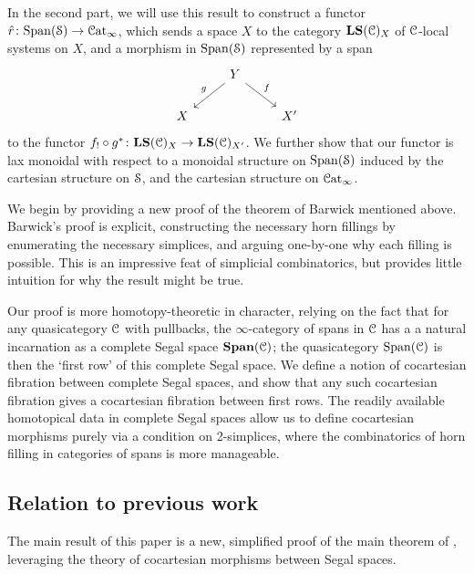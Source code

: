 \documentclass[main.tex]{subfiles}
\begin{document}
In the second part, we will use this result to construct a functor $\hat{r}\colon \Span(\category{S}) \to \ICat$, which sends a space $X$ to the category $\LS(\category{C})_{X}$ of $\category{C}$-local systems on $X$, and a morphism in $\Span(\S)$ represented by a span
\begin{equation*}
  \begin{tikzcd}
    & Y
    \arrow[dl, swap, "g"]
    \arrow[dr, "f"]
    \\
    X
    && X'
  \end{tikzcd}
\end{equation*}
to the functor $f_{!} \circ g^{*}\colon \LS(\category{C})_{X} \to \LS(\category{C})_{X'}$. We further show that our functor is lax monoidal with respect to a monoidal structure on $\Span(\S)$ induced by the cartesian structure on $\S$, and the cartesian structure on $\ICat$.

We begin by providing a new proof of the theorem of Barwick mentioned above. Barwick's proof is explicit, constructing the necessary horn fillings by enumerating the necessary simplices, and arguing one-by-one why each filling is possible. This is an impressive feat of simplicial combinatorics, but provides little intuition for why the result might be true.

Our proof is more homotopy-theoretic in character, relying on the fact that for any quasicategory $\category{C}$ with pullbacks, the $\infty$-category of spans in $\category{C}$ has a a natural incarnation as a complete Segal space $\SPAN(\category{C})$; the quasicategory $\Span(\category{C})$ is then the `first row' of this complete Segal space. We define a notion of cocartesian fibration between complete Segal spaces, and show that any such cocartesian fibration gives a cocartesian fibration between first rows. The readily available homotopical data in complete Segal spaces allow us to define cocartesian morphisms purely via a condition on 2-simplices, where the combinatorics of horn filling in categories of spans is more manageable.

\subsection{Relation to previous work}
\label{ssc:relation_to_previous_work}

The main result of this paper is a new, simplified proof of the main theorem of \cite{spectralmackeyfunctors1}, leveraging the theory of cocartesian morphisms between Segal spaces.
\end{document}
